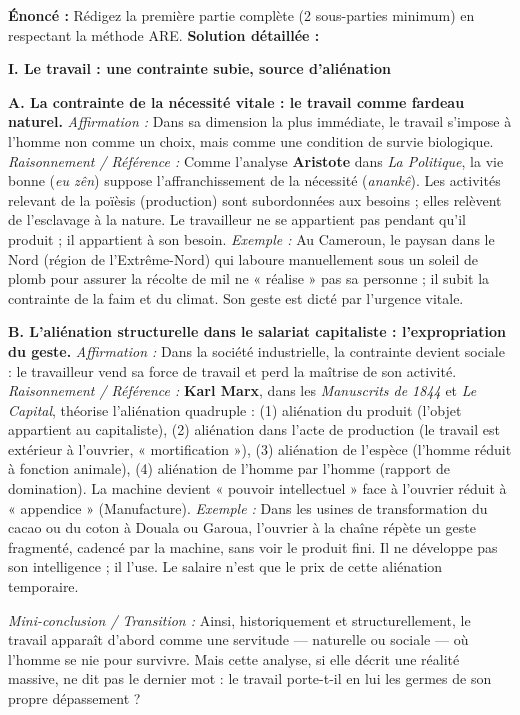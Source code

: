 \documentclass[11pt]{article}
\newcommand{\cle}[1]{{\popxbold\color{popdark}#1}}
\begin{document}
\begin{exoresolu}
\textbf{Énoncé :} Rédigez la première partie complète (2 sous-parties minimum) en respectant la méthode ARE.
\tcblower
\textbf{Solution détaillée :}

\textbf{I. Le travail : une contrainte subie, source d'aliénation}

\textbf{A. La contrainte de la nécessité vitale : le travail comme fardeau naturel.}
\textit{Affirmation :} Dans sa dimension la plus immédiate, le travail s'impose à l'homme non comme un choix, mais comme une condition de survie biologique.
\textit{Raisonnement / Référence :} Comme l'analyse \textbf{Aristote} dans \emph{La Politique}, la vie bonne (\emph{eu zên}) suppose l'affranchissement de la nécessité (\emph{anankê}). Les activités relevant de la \cle{poïèsis} (production) sont subordonnées aux besoins ; elles relèvent de l'esclavage à la nature. Le travailleur ne se appartient pas pendant qu'il produit ; il appartient à son besoin.
\textit{Exemple :} Au Cameroun, le paysan dans le Nord (région de l'Extrême-Nord) qui laboure manuellement sous un soleil de plomb pour assurer la récolte de mil ne « réalise » pas sa personne ; il subit la contrainte de la faim et du climat. Son geste est dicté par l'urgence vitale.

\textbf{B. L'aliénation structurelle dans le salariat capitaliste : l'expropriation du geste.}
\textit{Affirmation :} Dans la société industrielle, la contrainte devient sociale : le travailleur vend sa force de travail et perd la maîtrise de son activité.
\textit{Raisonnement / Référence :} \textbf{Karl Marx}, dans les \emph{Manuscrits de 1844} et \emph{Le Capital}, théorise l'\cle{aliénation} quadruple : (1) aliénation du produit (l'objet appartient au capitaliste), (2) aliénation dans l'acte de production (le travail est extérieur à l'ouvrier, « mortification »), (3) aliénation de l'espèce (l'homme réduit à fonction animale), (4) aliénation de l'homme par l'homme (rapport de domination). La machine devient « pouvoir intellectuel » face à l'ouvrier réduit à « appendice » (Manufacture).
\textit{Exemple :} Dans les usines de transformation du cacao ou du coton à Douala ou Garoua, l'ouvrier à la chaîne répète un geste fragmenté, cadencé par la machine, sans voir le produit fini. Il ne développe pas son intelligence ; il l'use. Le salaire n'est que le prix de cette aliénation temporaire.

\textit{Mini-conclusion / Transition :} Ainsi, historiquement et structurellement, le travail apparaît d'abord comme une \cle{servitude} — naturelle ou sociale — où l'homme se nie pour survivre. Mais cette analyse, si elle décrit une réalité massive, ne dit pas le dernier mot : le travail porte-t-il en lui les germes de son propre dépassement ?
\end{exoresolu}
\end{document}
